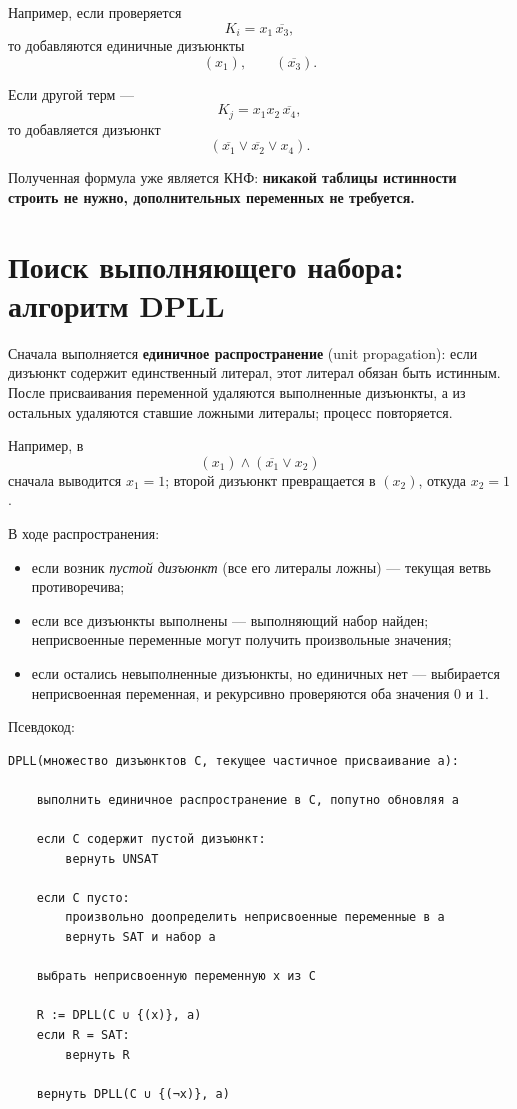 \documentclass[11pt]{article}
\newcommand{\imp}[1]{\overline{#1}}
\begin{document}
Например, если проверяется
\[
K_i = x_1\,\imp{x_3},
\]
то добавляются единичные дизъюнкты
\[
(x_1),\qquad (\imp{x_3}).
\]

Если другой терм —
\[
K_j = x_1 x_2 \,\imp{x_4},
\]
то добавляется дизъюнкт
\[
(\imp{x_1}\vee\imp{x_2}\vee x_4).
\]

Полученная формула уже является КНФ: \textbf{никакой таблицы истинности строить не нужно, дополнительных переменных не требуется.}

\section{Поиск выполняющего набора: алгоритм DPLL}

Сначала выполняется \textbf{единичное распространение} (unit propagation): если дизъюнкт содержит единственный литерал, этот литерал обязан быть истинным. После присваивания переменной удаляются выполненные дизъюнкты, а из остальных удаляются ставшие ложными литералы; процесс повторяется.

Например, в
\[
(x_1)\land(\imp{x_1}\vee x_2)
\]
сначала выводится $x_1=1$; второй дизъюнкт превращается в $(x_2)$, откуда $x_2=1$.

В ходе распространения:

\begin{itemize}
\item если возник \emph{пустой дизъюнкт} (все его литералы ложны) — текущая ветвь противоречива;
\item если все дизъюнкты выполнены — выполняющий набор найден; неприсвоенные переменные могут получить произвольные значения;
\item если остались невыполненные дизъюнкты, но единичных нет — выбирается неприсвоенная переменная, и рекурсивно проверяются оба значения $0$ и $1$.
\end{itemize}

Псевдокод:

\begin{Verbatim}[fontsize=\small,frame=single,framesep=6pt]
DPLL(множество дизъюнктов C, текущее частичное присваивание a):

    выполнить единичное распространение в C, попутно обновляя a

    если C содержит пустой дизъюнкт:
        вернуть UNSAT

    если C пусто:
        произвольно доопределить неприсвоенные переменные в a
        вернуть SAT и набор a

    выбрать неприсвоенную переменную x из C

    R := DPLL(C ∪ {(x)}, a)
    если R = SAT:
        вернуть R

    вернуть DPLL(C ∪ {(¬x)}, a)
\end{Verbatim}
\end{document}
